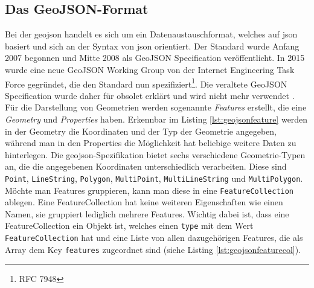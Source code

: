 \subsection{Das GeoJSON-Format}
Bei der \ac{geojson} handelt es sich um ein Datenaustauschformat, welches auf \ac{json} basiert und sich an der Syntax von \ac{json} orientiert. Der Standard wurde Anfang 2007 begonnen und Mitte 2008 als GeoJSON Specification veröffentlicht. In 2015 wurde eine neue GeoJSON Working Group von der Internet Engineering Task Force gegründet, die den Standard nun spezifiziert\footnote{RFC 7948}. Die veraltete GeoJSON Specification wurde daher für obsolet erklärt und wird nicht mehr verwendet \parencite{BUT2008}.\pbreak%
%
Für die Darstellung von Geometrien werden sogenannte \textit{Features} erstellt, die eine \textit{Geometry} und \textit{Properties} haben.
Erkennbar im Listing \ref{lst:geojsonfeature} werden in der Geometry die Koordinaten und der Typ der Geometrie angegeben, während man in den Properties die Möglichkeit hat beliebige weitere Daten zu hinterlegen.
Die \ac{geojson}-Spezifikation bietet sechs verschiedene Geometrie-Typen an, die die angegebenen Koordinaten unterschiedlich verarbeiten.
Diese sind \texttt{Point}, \texttt{LineString}, \texttt{Polygon}, \texttt{MultiPoint}, \texttt{MultiLineString} und \texttt{MultiPolygon}.
\pbreak
Möchte man Features gruppieren, kann man diese in eine \texttt{FeatureCollection} ablegen.
Eine FeatureCollection hat keine weiteren Eigenschaften wie einen Namen, sie gruppiert lediglich mehrere Features.
Wichtig dabei ist, dass eine FeatureCollection ein Objekt ist, welches einen \texttt{type} mit dem Wert \texttt{FeatureCollection} hat und eine Liste von allen dazugehörigen Features, die als Array dem Key \texttt{features} zugeordnet sind (siehe Listing \ref{lst:geojsonfeaturecol}).

